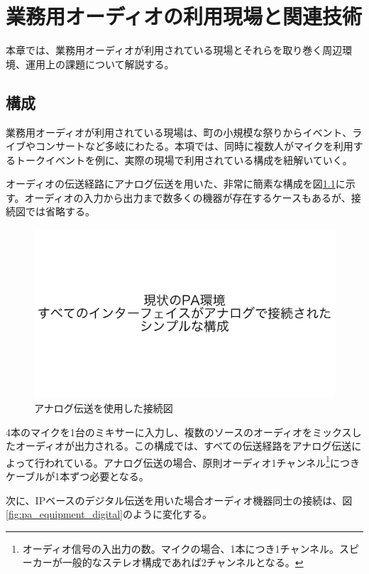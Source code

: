 \chapter{業務用オーディオの利用現場と関連技術}
\label{chap:related_works}

本章では、業務用オーディオが利用されている現場とそれらを取り巻く周辺環境、運用上の課題について解説する。

\section{構成}

業務用オーディオが利用されている現場は、町の小規模な祭りからイベント、ライブやコンサートなど多岐にわたる。本項では、同時に複数人がマイクを利用するトークイベントを例に、実際の現場で利用されている構成を紐解いていく。

オーディオの伝送経路にアナログ伝送を用いた、非常に簡素な構成を図\ref{fig:pa_equipment_analog}に示す。オーディオの入力から出力まで数多くの機器が存在するケースもあるが、接続図では省略する。

\begin{figure}[htbp]
  \centering
  \label{fig:pa_equipment_analog}
  \includegraphics[width=0.8\linewidth]{img/pa_equipment_analog.pdf}
  \caption{アナログ伝送を使用した接続図}
\end{figure}

4本のマイクを1台のミキサーに入力し、複数のソースのオーディオをミックスしたオーディオが出力される。この構成では、すべての伝送経路をアナログ伝送によって行われている。アナログ伝送の場合、原則オーディオ1チャンネル\footnote{オーディオ信号の入出力の数。マイクの場合、1本につき1チャンネル。スピーカーが一般的なステレオ構成であれば2チャンネルとなる。}につきケーブルが1本ずつ必要となる。

次に、IPベースのデジタル伝送を用いた場合オーディオ機器同士の接続は、図\ref{fig:pa_equipment_digital}のように変化する。

